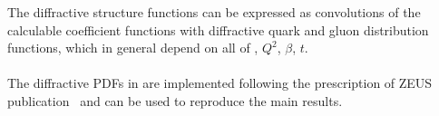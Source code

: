 The diffractive structure functions can be expressed as convolutions of the
calculable coefficient functions with diffractive quark and gluon distribution functions,
 which in general depend on all of \xpom, $Q^2$, $\beta$, $t$.
\\
\\
The diffractive PDFs in \fitter are implemented following the prescription of ZEUS
publication~\cite{zeus:diff2009} and can be used to reproduce the main results.
%
